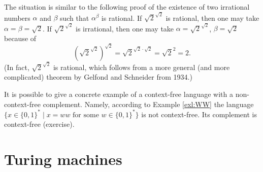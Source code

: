 \begin{page}
\setcounter{section}{7}
\setcounter{subsection}{3}
\setcounter{dfn}{9}
\label{portion:1175}

\begin{rem}
The situation is similar to the following proof of the existence of two irrational numbers $\alpha$ and $\beta$ such that $\alpha^\beta$ is rational.
If $\sqrt{2}^{\sqrt{2}}$ is rational, then one may take $\alpha = \beta = \sqrt{2}$.
If $\sqrt{2}^{\sqrt{2}}$ is irrational, then one may take $\alpha = \sqrt{2}^{\sqrt{2}}$, $\beta = \sqrt{2}$ because of
\[
\left(\sqrt{2}^{\sqrt{2}}\right)^{\sqrt{2}} = \sqrt{2}^{\sqrt{2} \cdot \sqrt{2}} = \sqrt{2}^2 = 2.
\]
(In fact, $\sqrt{2}^{\sqrt{2}}$ is rational, which follows from a more general (and more complicated) theorem by Gelfond and Schneider from 1934.)
\end{rem}

\end{page}

\begin{page}
\setcounter{section}{8}
\setcounter{subsection}{0}
\setcounter{dfn}{9}
\label{portion:1176}


It is possible to give a concrete example of a context-free language with a non-context-free complement.
Namely, according to Example \ref{exl:WW} the language $\{x \in \{0,1\}^* \mid x = ww \text{ for some } w \in \{0,1\}^*\}$
is not context-free. Its complement is context-free (exercise).












\end{page}

\begin{page}
\setcounter{section}{8}
\setcounter{subsection}{1}
\setcounter{dfn}{0}
\label{portion:1177}

\section{Turing machines}

\end{page}


